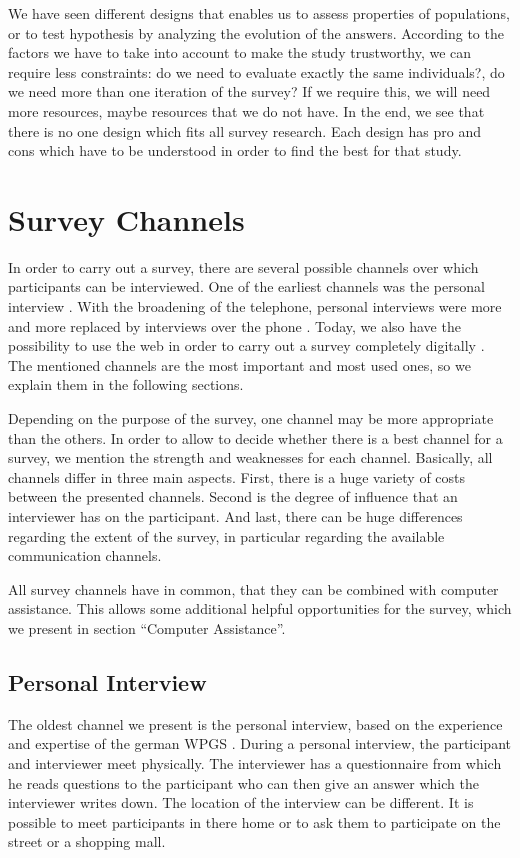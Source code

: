 \documentclass{report}
\begin{document}
We have seen different designs that enables us to assess properties of populations, or to test hypothesis by analyzing the evolution of the answers. According to the factors we have to take into account to make the study trustworthy, we can require less constraints: do we need to evaluate exactly the same individuals?, do we need more than one iteration of the survey? If we require this, we will need more resources, maybe resources that we do not have. In the end, we see that there is no one design which fits all survey research. Each design has pro and cons which have to be understood in order to find the best for that study.

\chapter{Survey Channels}

In order to carry out a survey, there are several possible channels over which participants can be interviewed. One of the earliest channels was the personal interview \cite{cpe}. With the broadening of the telephone, personal interviews were more and more replaced by interviews over the phone \cite{cph}. Today, we also have the possibility to use the web in order to carry out a survey completely digitally \cite{intro}. The mentioned channels are the most important and most used ones, so we explain them in the following sections.

Depending on the purpose of the survey, one channel may be more appropriate than the others. In order to allow to decide whether there is a best channel for a survey, we mention the strength and weaknesses for each channel. Basically, all channels differ in three main aspects. First, there is a huge variety of costs between the presented channels. Second is the degree of influence that an interviewer has on the participant. And last, there can be huge differences regarding the extent of the survey, in particular regarding the available communication channels.

All survey channels have in common, that they can be combined with computer assistance. This allows some additional helpful opportunities for the survey, which we present in section “Computer Assistance”.


\section{Personal Interview}

The oldest channel we present is the personal interview, based on the experience and expertise of the german WPGS \cite{cpe}. During a personal interview, the participant and interviewer meet physically. The interviewer has a questionnaire from which he reads questions to the participant who can then give an answer which the interviewer writes down. The location of the interview can be different. It is possible to meet participants in there home or to ask them to participate on the street or a shopping mall.
\end{document}
